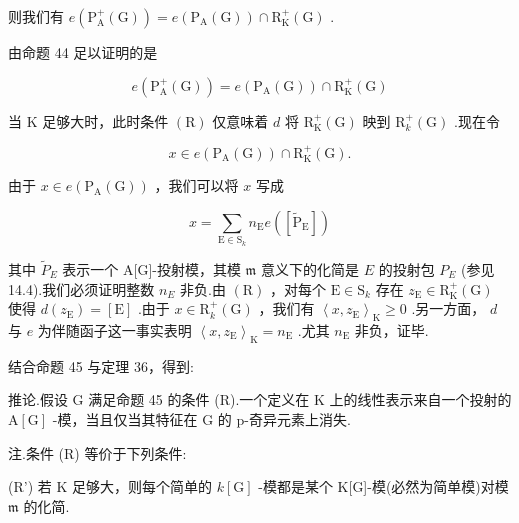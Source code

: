 \documentclass[10pt]{article}
\begin{document}
则我们有 \(e\left( {{\mathrm{P}}_{\mathrm{A}}^{ + }\left( \mathrm{G}\right) }\right)  = e\left( {{\mathrm{P}}_{\mathrm{A}}\left( \mathrm{G}\right) }\right)  \cap  {\mathrm{R}}_{\mathrm{K}}^{ + }\left( \mathrm{G}\right)\) .

由命题 44 足以证明的是

\[
e\left( {{\mathrm{P}}_{\mathrm{A}}^{ + }\left( \mathrm{G}\right) }\right)  = e\left( {{\mathrm{P}}_{\mathrm{A}}\left( \mathrm{G}\right) }\right)  \cap  {\mathrm{R}}_{\mathrm{K}}^{ + }\left( \mathrm{G}\right)
\]

当 \(\mathrm{K}\) 足够大时，此时条件 \(\left( \mathrm{R}\right)\) 仅意味着 \(d\) 将 \({\mathrm{R}}_{\mathrm{K}}^{ + }\left( \mathrm{G}\right)\) 映到 \({\mathrm{R}}_{k}^{ + }\left( \mathrm{G}\right)\) .现在令

\[
x \in  e\left( {{\mathrm{P}}_{\mathrm{A}}\left( \mathrm{G}\right) }\right)  \cap  {\mathrm{R}}_{\mathrm{K}}^{ + }\left( \mathrm{G}\right) .
\]

由于 \(x \in  e\left( {{\mathrm{P}}_{\mathrm{A}}\left( \mathrm{G}\right) }\right)\) ，我们可以将 \(x\) 写成

\[
x = \mathop{\sum }\limits_{{\mathrm{E} \in  {\mathrm{S}}_{k}}}{n}_{\mathrm{E}}e\left( \left\lbrack  {\widetilde{\mathrm{P}}}_{\mathrm{E}}\right\rbrack  \right)
\]

其中 \({\widetilde{P}}_{E}\) 表示一个 A[G]-投射模，其模 \(\mathfrak{m}\) 意义下的化简是 \(E\) 的投射包 \({P}_{E}\) (参见 14.4).我们必须证明整数 \({n}_{E}\) 非负.由 \(\left( \mathrm{R}\right)\) ，对每个 \(\mathrm{E} \in  {\mathrm{S}}_{k}\) 存在 \({z}_{\mathrm{E}} \in  {\mathrm{R}}_{\mathrm{K}}^{ + }\left( \mathrm{G}\right)\) 使得 \(d\left( {z}_{\mathrm{E}}\right)  = \left\lbrack  \mathrm{E}\right\rbrack\) .由于 \(x \in  {\mathrm{R}}_{k}^{ + }\left( \mathrm{G}\right)\) ，我们有 \({\left\langle  x,{z}_{\mathrm{E}}\right\rangle  }_{\mathrm{K}} \geq  0\) .另一方面， \(d\) 与 \(e\) 为伴随函子这一事实表明 \({\left\langle  x,{z}_{\mathrm{E}}\right\rangle  }_{\mathrm{K}} = {n}_{\mathrm{E}}\) .尤其 \({n}_{\mathrm{E}}\) 非负，证毕.

结合命题 45 与定理 36，得到:

推论.假设 G 满足命题 45 的条件 (R).一个定义在 \(\mathrm{K}\) 上的线性表示来自一个投射的 \(\mathrm{A}\left\lbrack  \mathrm{G}\right\rbrack\) -模，当且仅当其特征在 \(\mathrm{G}\) 的 p-奇异元素上消失.

注.条件 (R) 等价于下列条件:

(R’) 若 \(\mathrm{K}\) 足够大，则每个简单的 \(k\left\lbrack  \mathrm{G}\right\rbrack\) -模都是某个 K[G]-模(必然为简单模)对模 \(\mathfrak{m}\) 的化简.
\end{document}
